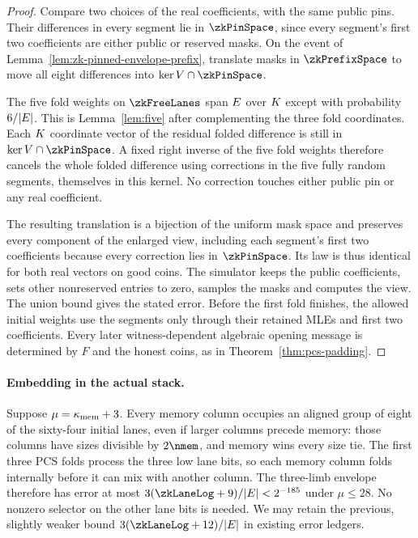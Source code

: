 \begin{proof}
Compare two choices of the real coefficients, with the same public pins. Their differences in every segment lie in $\zkPinSpace$, since every segment's first two coefficients are either public or reserved masks. On the event of Lemma~\ref{lem:zk-pinned-envelope-prefix}, translate masks in $\zkPrefixSpace$ to move all eight differences into $\ker V\cap\zkPinSpace$.

The five fold weights on $\zkFreeLanes$ span $E$ over $K$ except with probability $6/|E|$. This is Lemma~\ref{lem:five} after complementing the three fold coordinates. Each $K$ coordinate vector of the residual folded difference is still in $\ker V\cap\zkPinSpace$. A fixed right inverse of the five fold weights therefore cancels the whole folded difference using corrections in the five fully random segments, themselves in this kernel. No correction touches either public pin or any real coefficient.

The resulting translation is a bijection of the uniform mask space and preserves every component of the enlarged view, including each segment's first two coefficients because every correction lies in $\zkPinSpace$. Its law is thus identical for both real vectors on good coins. The simulator keeps the public coefficients, sets other nonreserved entries to zero, samples the masks and computes the view. The union bound gives the stated error. Before the first fold finishes, the allowed initial weights use the segments only through their retained MLEs and first two coefficients. Every later witness-dependent algebraic opening message is determined by $F$ and the honest coins, as in Theorem~\ref{thm:pcs-padding}.
\end{proof}

\paragraph{Embedding in the actual stack.} Suppose $\mu=\kappa_{\mathrm{mem}}+3$. Every memory column occupies an aligned group of eight of the sixty-four initial lanes, even if larger columns precede memory: those columns have sizes divisible by $2\nmem$, and memory wins every size tie. The first three PCS folds process the three low lane bits, so each memory column folds internally before it can mix with another column. The three-limb envelope therefore has error at most $3(\zkLaneLog+9)/|\E|<2^{-185}$ under $\mu\le28$. No nonzero selector on the other lane bits is needed. We may retain the previous, slightly weaker bound $3(\zkLaneLog+12)/|\E|$ in existing error ledgers.

